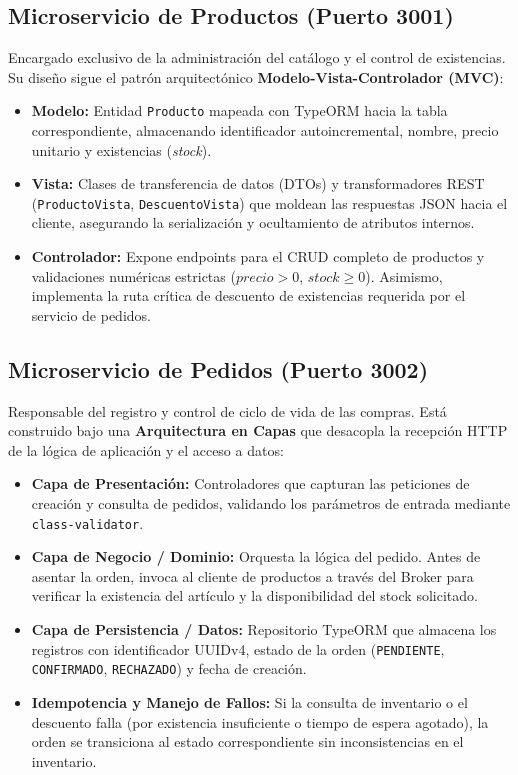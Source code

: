\documentclass[conference]{IEEEtran}
\begin{document}
\subsection{Microservicio de Productos (Puerto 3001)}
Encargado exclusivo de la administración del catálogo y el control de existencias. Su diseño sigue el patrón arquitectónico \textbf{Modelo-Vista-Controlador (MVC)}:
\begin{itemize}
    \item \textbf{Modelo:} Entidad \texttt{Producto} mapeada con TypeORM hacia la tabla correspondiente, almacenando identificador autoincremental, nombre, precio unitario y existencias (\textit{stock}).
    \item \textbf{Vista:} Clases de transferencia de datos (DTOs) y transformadores REST (\texttt{ProductoVista}, \texttt{DescuentoVista}) que moldean las respuestas JSON hacia el cliente, asegurando la serialización y ocultamiento de atributos internos.
    \item \textbf{Controlador:} Expone endpoints para el CRUD completo de productos y validaciones numéricas estrictas ($precio > 0$, $stock \ge 0$). Asimismo, implementa la ruta crítica de descuento de existencias requerida por el servicio de pedidos.
\end{itemize}

\subsection{Microservicio de Pedidos (Puerto 3002)}
Responsable del registro y control de ciclo de vida de las compras. Está construido bajo una \textbf{Arquitectura en Capas} que desacopla la recepción HTTP de la lógica de aplicación y el acceso a datos:
\begin{itemize}
    \item \textbf{Capa de Presentación:} Controladores que capturan las peticiones de creación y consulta de pedidos, validando los parámetros de entrada mediante \texttt{class-validator}.
    \item \textbf{Capa de Negocio / Dominio:} Orquesta la lógica del pedido. Antes de asentar la orden, invoca al cliente de productos a través del Broker para verificar la existencia del artículo y la disponibilidad del stock solicitado.
    \item \textbf{Capa de Persistencia / Datos:} Repositorio TypeORM que almacena los registros con identificador UUIDv4, estado de la orden (\texttt{PENDIENTE}, \texttt{CONFIRMADO}, \texttt{RECHAZADO}) y fecha de creación.
    \item \textbf{Idempotencia y Manejo de Fallos:} Si la consulta de inventario o el descuento falla (por existencia insuficiente o tiempo de espera agotado), la orden se transiciona al estado correspondiente sin inconsistencias en el inventario.
\end{itemize}
\end{document}
